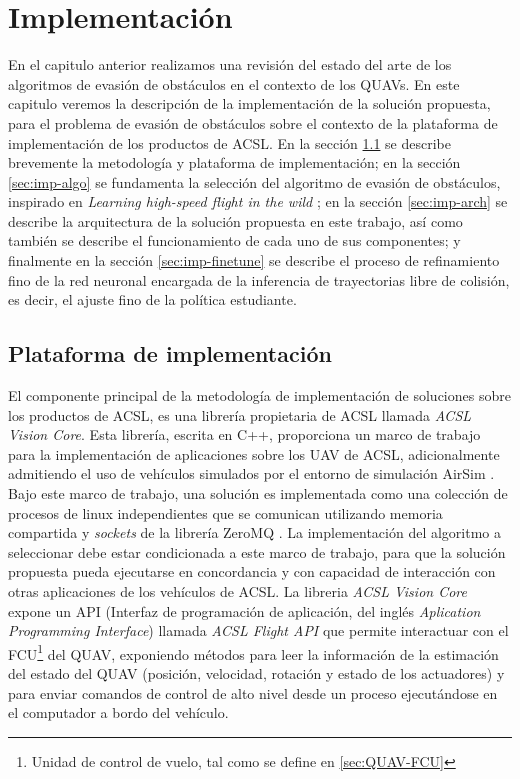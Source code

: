\chapter{Implementación}
\label{capitulo5}

En el capitulo anterior realizamos una revisión del estado del arte de los algoritmos de evasión de obstáculos en el contexto de los QUAVs. En este capitulo veremos la descripción de la implementación de la solución propuesta, para el problema de evasión de obstáculos sobre el contexto de la plataforma de implementación de los productos de ACSL. En la sección \ref{sec:imp-platform} se describe brevemente la metodología y plataforma de implementación; en la sección \ref{sec:imp-algo} se fundamenta la selección del algoritmo de evasión de obstáculos, inspirado en \textit{Learning high-speed flight in the wild} \cite{Loquercio2021}; en la sección \ref{sec:imp-arch} se describe la arquitectura de la solución propuesta en este trabajo, así como también se describe el funcionamiento de cada uno de sus componentes; y finalmente en la sección \ref{sec:imp-finetune} se describe el proceso de refinamiento fino de la red neuronal encargada de la inferencia de trayectorias libre de colisión, es decir, el ajuste fino de la política estudiante.

\section{Plataforma de implementación}

\label{sec:imp-platform}

El componente principal de la metodología de implementación de soluciones sobre los productos de ACSL, es una librería propietaria de ACSL llamada \textit{ACSL Vision Core}. Esta librería, escrita en C++, proporciona un marco de trabajo para la implementación de aplicaciones sobre los UAV de ACSL, adicionalmente admitiendo el uso de vehículos simulados por el entorno de simulación AirSim \cite{shah2018airsim}. Bajo este marco de trabajo, una solución es implementada como una colección de procesos de linux independientes que se comunican utilizando memoria compartida y \textit{sockets} de la librería ZeroMQ \cite{zeroMQ}. La implementación del algoritmo a seleccionar debe estar condicionada a este marco de trabajo, para que la solución propuesta pueda ejecutarse en concordancia y con capacidad de interacción con otras aplicaciones de los vehículos de ACSL. La libreria \textit{ACSL Vision Core} expone un API (Interfaz de programación de aplicación, del inglés \textit{Aplication Programming Interface}) llamada \textit{ACSL Flight API} que permite interactuar con el FCU\footnote{Unidad de control de vuelo, tal como se define en \ref{sec:QUAV-FCU}} del QUAV, exponiendo métodos para leer la información de la estimación del estado del QUAV (posición, velocidad, rotación y estado de los actuadores) y para enviar comandos de control de alto nivel desde un proceso ejecutándose en el computador a bordo del vehículo.

